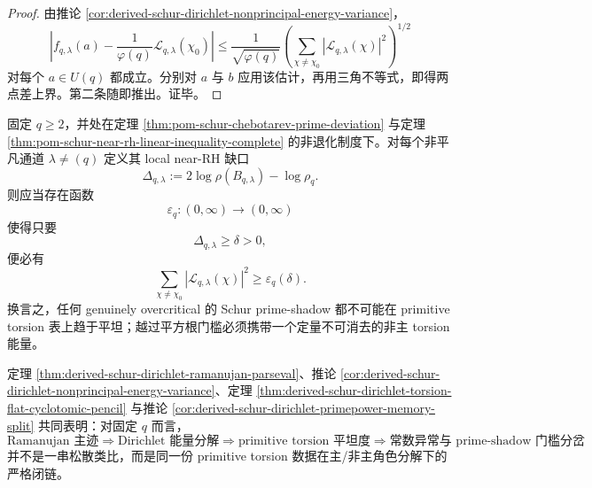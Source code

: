 \begin{proof}
由推论 \ref{cor:derived-schur-dirichlet-nonprincipal-energy-variance}，
\[
\left|f_{q,\lambda}(a)-\frac{1}{\varphi(q)}\mathcal L_{q,\lambda}(\chi_0)\right|
\le
\frac{1}{\sqrt{\varphi(q)}}
\left(\sum_{\chi\neq\chi_0}|\mathcal L_{q,\lambda}(\chi)|^2\right)^{1/2}
\]
对每个 \(a\in U(q)\) 都成立。分别对 \(a\) 与 \(b\) 应用该估计，再用三角不等式，即得两点差上界。第二条随即推出。证毕。
\end{proof}

\begin{conjecture}\label{conj:derived-schur-dirichlet-overcritical-energy-gap}
固定 \(q\ge 2\)，并处在定理 \ref{thm:pom-schur-chebotarev-prime-deviation} 与定理 \ref{thm:pom-schur-near-rh-linear-inequality-complete} 的非退化制度下。对每个非平凡通道 \(\lambda\neq (q)\) 定义其 local near-RH 缺口
\[
\Delta_{q,\lambda}:=2\log\rho(B_{q,\lambda})-\log\rho_q.
\]
则应当存在函数
\[
\varepsilon_q:(0,\infty)\to(0,\infty)
\]
使得只要
\[
\Delta_{q,\lambda}\ge \delta>0,
\]
便必有
\[
\sum_{\chi\neq\chi_0}|\mathcal L_{q,\lambda}(\chi)|^2\ge \varepsilon_q(\delta).
\]
换言之，任何 genuinely overcritical 的 Schur prime-shadow 都不可能在 primitive torsion 表上趋于平坦；越过平方根门槛必须携带一个定量不可消去的非主 torsion 能量。
\end{conjecture}

\begin{remark}[统一链]\label{rem:derived-schur-dirichlet-torsion-unified-chain}
定理 \ref{thm:derived-schur-dirichlet-ramanujan-parseval}、推论 \ref{cor:derived-schur-dirichlet-nonprincipal-energy-variance}、定理 \ref{thm:derived-schur-dirichlet-torsion-flat-cyclotomic-pencil} 与推论 \ref{cor:derived-schur-dirichlet-primepower-memory-split} 共同表明：对固定 \(q\) 而言，
\[
\text{Ramanujan 主迹}
\Longrightarrow
\text{Dirichlet 能量分解}
\Longrightarrow
\text{primitive torsion 平坦度}
\Longrightarrow
\text{常数异常与 prime-shadow 门槛分岔}
\]
并不是一串松散类比，而是同一份 primitive torsion 数据在主/非主角色分解下的严格闭链。
\end{remark}

\endinput
